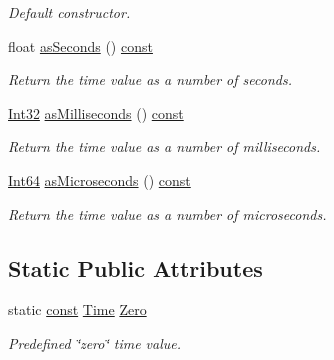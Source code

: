 \begin{DoxyCompactItemize}
\begin{DoxyCompactList}\small\item\em Default constructor. \end{DoxyCompactList}\item 
float \hyperlink{classsf_1_1_time_a7538140d095e48da9d7eee015dd455a9}{as\-Seconds} () \hyperlink{term__entry_8h_a57bd63ce7f9a353488880e3de6692d5a}{const} 
\begin{DoxyCompactList}\small\item\em Return the time value as a number of seconds. \end{DoxyCompactList}\item 
\hyperlink{namespacesf_ac2dfd4952377a26dee4750e2e4a30a15}{Int32} \hyperlink{classsf_1_1_time_a85e6deb41fa71896508ce0f64059a6ae}{as\-Milliseconds} () \hyperlink{term__entry_8h_a57bd63ce7f9a353488880e3de6692d5a}{const} 
\begin{DoxyCompactList}\small\item\em Return the time value as a number of milliseconds. \end{DoxyCompactList}\item 
\hyperlink{namespacesf_a2840579fed3494d9f330baf7a5a19903}{Int64} \hyperlink{classsf_1_1_time_ae41a7e0ca73ceea771b3c150c12abdd2}{as\-Microseconds} () \hyperlink{term__entry_8h_a57bd63ce7f9a353488880e3de6692d5a}{const} 
\begin{DoxyCompactList}\small\item\em Return the time value as a number of microseconds. \end{DoxyCompactList}\end{DoxyCompactItemize}
\subsection*{Static Public Attributes}
\begin{DoxyCompactItemize}
\item 
static \hyperlink{term__entry_8h_a57bd63ce7f9a353488880e3de6692d5a}{const} \hyperlink{classsf_1_1_time}{Time} \hyperlink{classsf_1_1_time_aa343e67f43a940e7b3b51aa10a495f2f}{Zero}
\begin{DoxyCompactList}\small\item\em Predefined \char`\"{}zero\char`\"{} time value. \end{DoxyCompactList}\end{DoxyCompactItemize}
